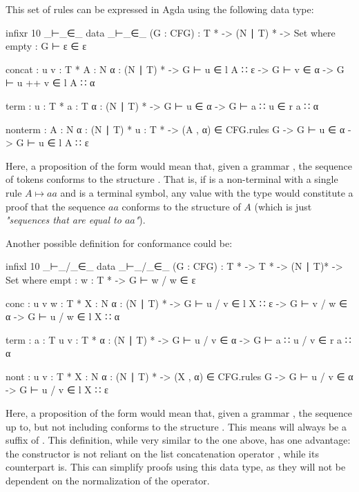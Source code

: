 	This set of rules can be expressed in Agda using the following data type:

	\begin{code}
		infixr 10 _⊢_∈_
		data _⊢_∈_ (G : CFG) :  T * -> (N ∣ T) * -> Set where
		  empty :
		    G ⊢ ε ∈ ε

		  concat : {u v : T *} {A : N} {α : (N ∣ T) *} ->
		    G ⊢ u ∈ l A ∷ ε -> G ⊢ v ∈ α -> G ⊢ u ++ v ∈ l A ∷ α

		  term : {u : T *} {a : T} {α : (N ∣ T) *} ->
		    G ⊢ u ∈ α -> G ⊢ a ∷ u ∈ r a ∷ α

		  nonterm : {A : N} {α : (N ∣ T) *} {u : T *} ->
		    (A , α) ∈ CFG.rules G -> G ⊢ u ∈ α -> G ⊢ u ∈ l A ∷ ε
	\end{code}

	Here, a proposition of the form  would mean that, given a
	grammar , the sequence of tokens  conforms to the
	structure . That is, if  is a non-terminal with a
	single rule $A \mapsto aa$ and  is a terminal symbol, any value
	with the type  would constitute a proof
	that the sequence $aa$ conforms to the structure of $A$ (which is just
	\emph{"sequences that are equal to $aa$"}).

	Another possible definition for conformance could be:

	\begin{code}
		infixl 10 _⊢_/_∈_
		data _⊢_/_∈_ (G : CFG) : T * -> T * -> (N ∣ T)* -> Set where
		  empt : {w : T *} ->
		    G ⊢ w / w ∈ ε

		  conc : {u v w : T *} {X : N} {α : (N ∣ T) *} ->
		    G ⊢ u / v ∈ l X ∷ ε ->
		    G ⊢ v / w ∈ α ->
		      G ⊢ u / w ∈ l X ∷ α

		  term : {a : T} {u v : T *} {α : (N ∣ T) *} ->
		    G ⊢ u / v ∈ α ->
		      G ⊢ a ∷ u / v ∈ r a ∷ α

		  nont : {u v : T *} {X : N} {α : (N ∣ T) *} ->
		    (X , α) ∈ CFG.rules G ->
		    G ⊢ u / v ∈ α ->
		    G ⊢ u / v ∈ l X ∷ ε
	\end{code}

	Here, a proposition of the form  would mean that,
	given a grammar , the sequence  up to, but not
	including  conforms to the structure . This means
	 will always be a suffix of . This definition, while
	very similar to the one above, has one advantage: the constructor
	 is not reliant on the list concatenation operator
	\codett{++}, while its counterpart  is. This can simplify
	proofs using this data type, as they will not be dependent on the
	normalization of the \codett{++} operator.

